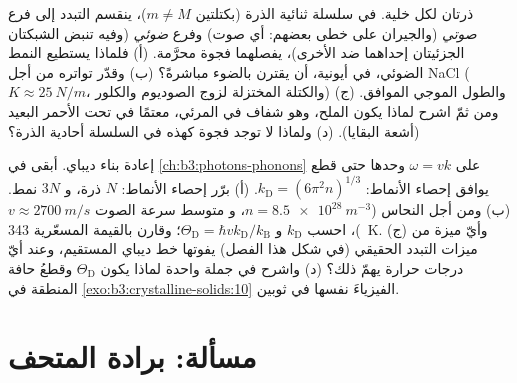 \begin{exercise}[$\star\star\star$]\label{exo:b3:crystalline-solids:11}
ذرتان لكل خلية. في سلسلة ثنائية الذرة (بكتلتين $m \ne M$)، ينقسم
التبدد إلى فرع \emph{صوتي} (والجيران على خطى بعضهم:
أي صوت) وفرع \emph{ضوئي} (وفيه تنبض الشبكتان الجزئيتان
إحداهما ضد الأخرى)، يفصلهما فجوة محرَّمة. (أ) فلماذا
يستطيع النمط الضوئي، في  أيونية، أن يقترن بالضوء مباشرةً؟ (ب)
وقدّر تواتره من أجل NaCl ($K \approx
\qty{25}{N/m}$، والكتلة المختزلة لزوج الصوديوم والكلور) والطول
الموجي الموافق. (ج) ومن ثمّ اشرح لماذا يكون الملح، وهو شفاف
في المرئي، معتمًا في تحت الأحمر البعيد (أشعة البقايا). (د)
ولماذا لا توجد فجوة كهذه في السلسلة أحادية الذرة؟
\end{exercise}

\begin{exercise}[$\star\star\star$]\label{exo:b3:crystalline-solids:12}
إعادة بناء ديباي. أبقى  في \cref{ch:b3:photons-phonons}
على $\omega = vk$ وحدها حتى قطع يوافق إحصاء الأنماط:
$k_{\text{D}} = (6\pi^2n)^{1/3}$. (أ) برّر إحصاء الأنماط:
$N$ ذرة، و $3N$ نمط. (ب) ومن أجل النحاس ($n = \qty{8.5e28}{m^{-3}}$، و
متوسط سرعة الصوت $v \approx \qty{2700}{m/s}$)، احسب
$k_{\text{D}}$ و $\Theta_{\text{D}} =
\hbar vk_{\text{D}}/k_{\text{B}}$؛ وقارن بالقيمة المسعّرية
\qty{343}{K}. (ج) وأيّ ميزة من ميزات التبدد الحقيقي (في شكل هذا الفصل)
يفوتها خط ديباي المستقيم، وعند أيّ درجات حرارة
يهمّ ذلك؟ (د) واشرح في جملة واحدة لماذا يكون
$\Theta_{\text{D}}$ وقطعُ حافة المنطقة في
\cref{exo:b3:crystalline-solids:10} الفيزياءَ نفسها في ثوبين.
\end{exercise}

\section{مسألة: برادة المتحف}

